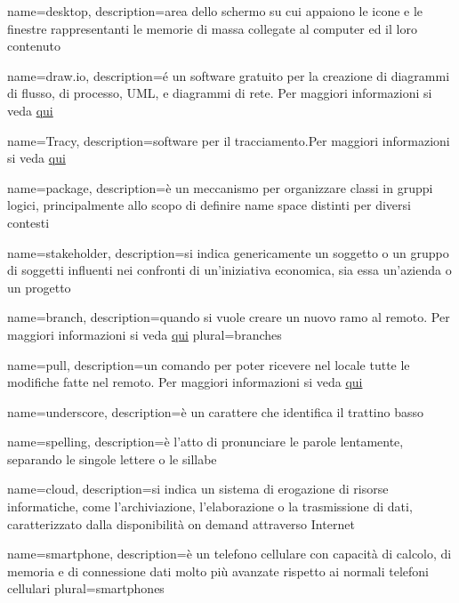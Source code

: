  {
	name=desktop,
	description={area dello schermo su cui appaiono le icone e le finestre rappresentanti le memorie di massa collegate al computer ed il loro contenuto}
}

 {
	name=draw.io,
	description={é un software gratuito per la creazione di diagrammi di flusso, di processo, UML, e diagrammi di rete. Per maggiori informazioni si veda \href{https://www.draw.io}{qui}}
}

 {
	name=Tracy,
	description={software  per il tracciamento.Per maggiori informazioni si veda \href{http://tracy-tpiga.rhcloud.com/tracy/}{qui}}
}

 {
	name=package,
	description={è un meccanismo per organizzare classi  in gruppi logici, principalmente allo scopo di definire name space distinti per diversi contesti}
}

 {
	name=stakeholder,
	description={si indica genericamente un soggetto o un gruppo di soggetti influenti nei confronti di un'iniziativa economica, sia essa un'azienda o un progetto}
}

 {
	name=branch,
	description={quando si vuole creare un nuovo ramo al  remoto. Per maggiori informazioni si veda \href{https://git-scm.com/docs/}{qui}}
	plural=branches
}

 {
	name=pull,
	description={un comando  per poter ricevere nel locale tutte le modifiche fatte nel  remoto. Per maggiori informazioni si veda \href{https://git-scm.com/docs/}{qui}}
}

 {
	name=underscore,
	description={è un carattere che identifica il trattino basso}
}

 {
	name=spelling,
	description={è l'atto di pronunciare le parole lentamente, separando le singole lettere o le sillabe}
}

 {
	name=cloud,
	description={si indica un sistema di erogazione di risorse informatiche, come l'archiviazione, l'elaborazione o la trasmissione di dati, caratterizzato dalla disponibilità on demand attraverso Internet}
}

 {
	name=smartphone,
	description={è un telefono cellulare con capacità di calcolo, di memoria e di connessione dati molto più avanzate rispetto ai normali telefoni cellulari}
	plural=smartphones
}

